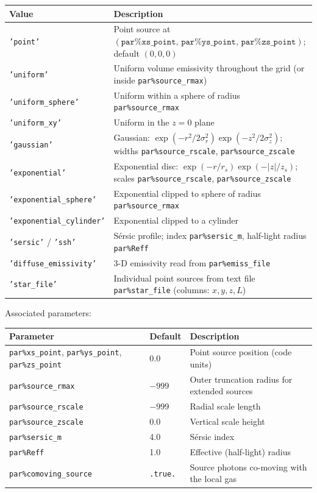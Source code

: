 \documentclass[english,a4paper]{my_memo}
\newcommand{\parm}[1]{\texttt{par\%#1}}
\begin{document}
\begin{center}
\begin{tabular}{L{4.7cm}L{10cm}}
\toprule
Value & Description \\
\midrule
\texttt{'point'} & Point source at $(\parm{xs\_point},\,\parm{ys\_point},\,\parm{zs\_point})$; default $(0,0,0)$ \\
\texttt{'uniform'} & Uniform volume emissivity throughout the grid (or inside \parm{source\_rmax}) \\
\texttt{'uniform\_sphere'} & Uniform within a sphere of radius \parm{source\_rmax} \\
\texttt{'uniform\_xy'} & Uniform in the $z=0$ plane \\
\texttt{'gaussian'} & Gaussian: $\exp(-r^2/2\sigma_r^2)\exp(-z^2/2\sigma_z^2)$; widths \parm{source\_rscale}, \parm{source\_zscale} \\
\texttt{'exponential'} & Exponential disc: $\exp(-r/r_s)\exp(-|z|/z_s)$; scales \parm{source\_rscale}, \parm{source\_zscale} \\
\texttt{'exponential\_sphere'} & Exponential clipped to sphere of radius \parm{source\_rmax} \\
\texttt{'exponential\_cylinder'} & Exponential clipped to a cylinder \\
\texttt{'sersic'} / \texttt{'ssh'} & S\'{e}rsic profile; index \parm{sersic\_m}, half-light radius \parm{Reff} \\
\texttt{'diffuse\_emissivity'} & 3-D emissivity read from \parm{emiss\_file} \\
\texttt{'star\_file'} & Individual point sources from text file \parm{star\_file} (columns: $x,y,z,L$) \\
\bottomrule
\end{tabular}
\end{center}

Associated parameters:

\begin{center}
\begin{tabular}{@{}l@{\hspace{1.5em}}l@{\hspace{1.5em}}l@{}}
\toprule
Parameter & Default & Description \\
\midrule
\parm{xs\_point}, \parm{ys\_point}, \parm{zs\_point} & 0.0 & Point source position (code units) \\
\parm{source\_rmax}   & $-999$ & Outer truncation radius for extended sources \\
\parm{source\_rscale} & $-999$ & Radial scale length \\
\parm{source\_zscale} & 0.0   & Vertical scale height \\
\parm{sersic\_m}      & 4.0   & S\'{e}rsic index \\
\parm{Reff}           & 1.0   & Effective (half-light) radius \\
\parm{comoving\_source} & \texttt{.true.} & Source photons co-moving with the local gas \\
\bottomrule
\end{tabular}
\end{center}
\end{document}
